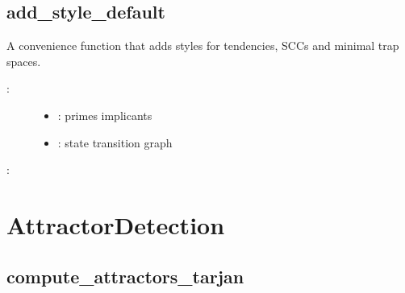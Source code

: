 \documentclass[letterpaper,10pt,english]{sphinxmanual}
\begin{document}
\subsection{add\_style\_default}
\label{\detokenize{StateTransitionGraphs:add-style-default}}\label{\detokenize{StateTransitionGraphs:stgs-add-style-default}}

\begin{fulllineitems}
\label{\detokenize{StateTransitionGraphs:PyBoolNet.StateTransitionGraphs.add_style_default}}
A convenience function that adds styles for tendencies, SCCs and minimal trap spaces.
\begin{description}
\item[{:}] \leavevmode\begin{itemize}
\item {} 
: primes implicants

\item {} 
: state transition graph

\end{itemize}

\end{description}

:

\begin{sphinxVerbatim}[commandchars=\\\{\}]
\end{sphinxVerbatim}

\end{fulllineitems}



\section{AttractorDetection}
\label{\detokenize{AttractorDetection:attractordetection}}\label{\detokenize{AttractorDetection::doc}}\label{\detokenize{AttractorDetection:id1}}

\subsection{compute\_attractors\_tarjan}
\label{\detokenize{AttractorDetection:id2}}\label{\detokenize{AttractorDetection:compute-attractors-tarjan}}
\end{document}

